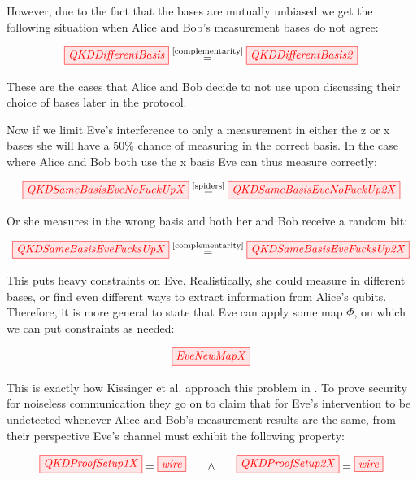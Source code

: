 \documentclass[]{article}
\newcommand{\equaltext}[1]{\ensuremath{\stackrel{\text{#1}}{=}}}
\begin{document}
However, due to the fact that the bases are mutually unbiased we get the following situation when Alice and Bob's measurement bases do not agree:

\begin{equation}
\tikzfig{QKDDifferentBasis} \equaltext{\ref{complementarity}} \tikzfig{QKDDifferentBasis2}
\end{equation}

These are the cases that Alice and Bob decide to not use upon discussing their choice of bases later in the protocol.

Now if we limit Eve's interference to only a measurement in either the z or x bases she will have a 50\% chance of measuring in the correct basis. In the case where Alice and Bob both use the x basis Eve can thus measure correctly:

\begin{equation}
	\tikzfig{QKDSameBasisEveNoFuckUpX} \equaltext{\ref{spiders}} \tikzfig{QKDSameBasisEveNoFuckUp2X} 
\end{equation}

Or she measures in the wrong basis and both her and Bob receive a random bit:

\begin{equation}
	\tikzfig{QKDSameBasisEveFucksUpX} \equaltext{\ref{complementarity}} \tikzfig{QKDSameBasisEveFucksUp2X}
\end{equation}

This puts heavy constraints on Eve. Realistically, she could measure in different bases, or find even different ways to extract information from Alice's qubits. Therefore, it is more general to state that Eve can apply some map $\Phi$, on which we can put constraints as needed:

\begin{equation}
	\label{equation:EveNewMap}
	\tikzfig{EveNewMapX}
\end{equation}

This is exactly how Kissinger et al. approach this problem in \cite{Kissinger2017}. To prove security for noiseless communication they go on to claim that for Eve's intervention to be undetected whenever Alice and Bob's measurement results are the same, from their perspective Eve's channel must exhibit the following property:

\begin{equation}
	\label{QKDProofSetup}
	\tikzfig{QKDProofSetup1X} = \tikzfig{wire} ~~~~~ \land ~~~~~ \tikzfig{QKDProofSetup2X} = \tikzfig{wire}
\end{equation}
\end{document}
